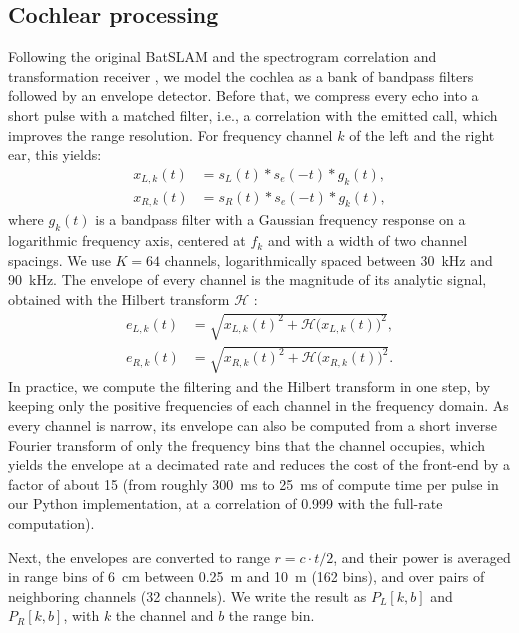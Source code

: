 \documentclass[journal]{IEEEtran}
\begin{document}
\subsection{Cochlear processing}
Following the original BatSLAM \cite{steckelBatSLAMSimultaneousLocalization2013} and the spectrogram correlation and transformation receiver \cite{peremansSpectrogramCorrelationTransformation1998}, we model the cochlea as a bank of bandpass filters followed by an envelope detector. Before that, we compress every echo into a short pulse with a matched filter, i.e., a correlation with the emitted call, which improves the range resolution. For frequency channel $k$ of the left and the right ear, this yields:
\begin{equation}
\begin{aligned}
x_{L,k}(t) &= s_L(t) * s_e(-t) * g_k(t), \\
x_{R,k}(t) &= s_R(t) * s_e(-t) * g_k(t),
\end{aligned}
\end{equation}
%
where $g_k(t)$ is a bandpass filter with a Gaussian frequency response on a logarithmic frequency axis, centered at $f_k$ and with a width of two channel spacings. We use $K = 64$ channels, logarithmically spaced between \SI{30}{\kilo\hertz} and \SI{90}{\kilo\hertz}. The envelope of every channel is the magnitude of its analytic signal, obtained with the Hilbert transform $\mathcal{H}$ \cite{marpleComputingDiscretetimeAnalytic1999}:
\begin{equation}
\begin{aligned}
e_{L,k}(t) &= \sqrt{x_{L,k}(t)^2 + \mathcal{H}\big(x_{L,k}(t)\big)^2}, \\
e_{R,k}(t) &= \sqrt{x_{R,k}(t)^2 + \mathcal{H}\big(x_{R,k}(t)\big)^2}.
\end{aligned}
\end{equation}
%
In practice, we compute the filtering and the Hilbert transform in one step, by keeping only the positive frequencies of each channel in the frequency domain. As every channel is narrow, its envelope can also be computed from a short inverse Fourier transform of only the frequency bins that the channel occupies, which yields the envelope at a decimated rate and reduces the cost of the front-end by a factor of about 15 (from roughly \SI{300}{\milli\second} to \SI{25}{\milli\second} of compute time per pulse in our Python implementation, at a correlation of 0.999 with the full-rate computation).

Next, the envelopes are converted to range $r = c \cdot t / 2$, and their power is averaged in range bins of \SI{6}{\centi\meter} between \SI{0.25}{\meter} and \SI{10}{\meter} (162 bins), and over pairs of neighboring channels (32 channels). We write the result as $P_L[k,b]$ and $P_R[k,b]$, with $k$ the channel and $b$ the range bin.
\end{document}
